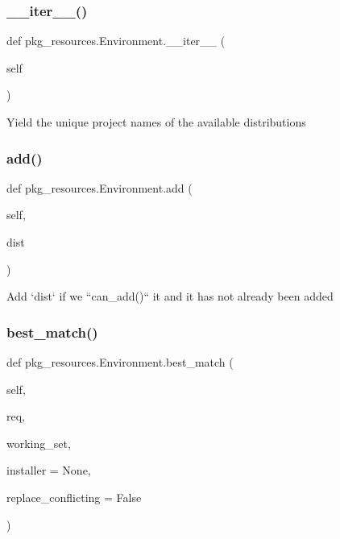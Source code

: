 \subsubsection{\texorpdfstring{\+\_\+\+\_\+iter\+\_\+\+\_\+()}{\_\_iter\_\_()}}
{\footnotesize\ttfamily def pkg\+\_\+resources.\+Environment.\+\_\+\+\_\+iter\+\_\+\+\_\+ (\begin{DoxyParamCaption}\item[{}]{self }\end{DoxyParamCaption})}

\begin{DoxyVerb}Yield the unique project names of the available distributions\end{DoxyVerb}
 \mbox{\label{classpkg__resources_1_1Environment_a0ba8999abdb4cbc7a1965766560197fc}} 
\subsubsection{\texorpdfstring{add()}{add()}}
{\footnotesize\ttfamily def pkg\+\_\+resources.\+Environment.\+add (\begin{DoxyParamCaption}\item[{}]{self,  }\item[{}]{dist }\end{DoxyParamCaption})}

\begin{DoxyVerb}Add `dist` if we ``can_add()`` it and it has not already been added
\end{DoxyVerb}
 \mbox{\label{classpkg__resources_1_1Environment_a7738575eddd2a89e35eff52f3462f20b}} 
\subsubsection{\texorpdfstring{best\+\_\+match()}{best\_match()}}
{\footnotesize\ttfamily def pkg\+\_\+resources.\+Environment.\+best\+\_\+match (\begin{DoxyParamCaption}\item[{}]{self,  }\item[{}]{req,  }\item[{}]{working\+\_\+set,  }\item[{}]{installer = {\ttfamily None},  }\item[{}]{replace\+\_\+conflicting = {\ttfamily False} }\end{DoxyParamCaption})}

